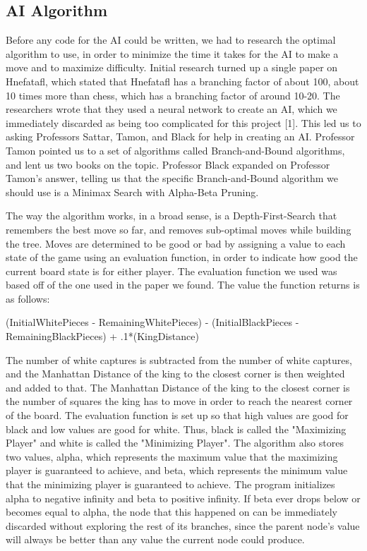 \documentclass{article}
\begin{document}
\subsection{AI Algorithm}
	Before any code for the AI could be written, we had to research the optimal algorithm to use, in order to minimize the time it takes for the AI to make a move and to maximize difficulty. Initial research turned up a single paper on Hnefatafl, which stated that Hnefatafl has a branching factor of about 100, about 10 times more than chess, which has a branching factor of around 10-20. The researchers wrote that they used a neural network to create an AI, which we immediately discarded as being too complicated for this project [1]. This led us to asking Professors Sattar, Tamon, and Black for help in creating an AI. Professor Tamon pointed us to a set of algorithms called Branch-and-Bound algorithms, and lent us two books on the topic. Professor Black expanded on Professor Tamon's answer, telling us that the specific Branch-and-Bound algorithm we should use is a Minimax Search with Alpha-Beta Pruning. \par
	The way the algorithm works, in a broad sense, is a Depth-First-Search that remembers the best move so far, and removes sub-optimal moves while building the tree. Moves are determined to be good or bad by assigning a value to each state of the game using an evaluation function, in order to indicate how good the current board state is for either player. The evaluation function we used was based off of the one used in the paper we found. The value the function returns is as follows:
\begin{center}
	(InitialWhitePieces - RemainingWhitePieces) - (InitialBlackPieces - RemainingBlackPieces) + .1*(KingDistance)
\end{center}
The number of white captures is subtracted from the number of white captures, and the Manhattan Distance of the king to the closest corner is then weighted and added to that. The Manhattan Distance of the king to the closest corner is the number of squares the king has to move in order to reach the nearest corner of the board. The evaluation function is set up so that high values are good for black and low values are good for white. Thus, black is called the "Maximizing Player" and white is called the "Minimizing Player". The algorithm also stores two values, alpha, which represents the maximum value that the maximizing player is guaranteed to achieve, and beta, which represents the minimum value that the minimizing player is guaranteed to achieve. The program initializes alpha to negative infinity and beta to positive infinity. If beta ever drops below or becomes equal to alpha, the node that this happened on can be immediately discarded without exploring the rest of its branches, since the parent node's value will always be better than any value the current node could produce. \par
\end{document}
